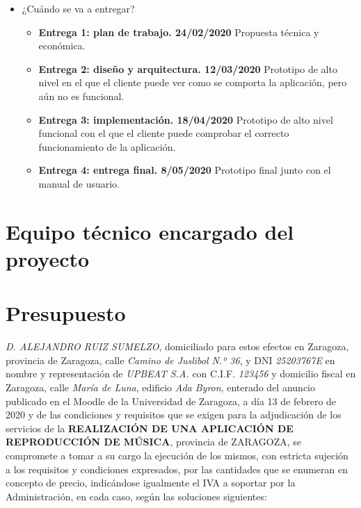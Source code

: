 \documentclass{article}
\begin{document}
\begin{itemize}
	\item ¿Cuándo se va a entregar?
	\begin{itemize}
		\item \textbf{Entrega 1: plan de trabajo. 24/02/2020}
		Propuesta técnica y económica.
		\item \textbf{Entrega 2: diseño y arquitectura. 12/03/2020}
		Prototipo de alto nivel en el que el cliente puede ver como se comporta la aplicación, pero aún no es funcional.
		\item \textbf{Entrega 3: implementación. 18/04/2020}
		Prototipo de alto nivel funcional con el que el cliente puede comprobar el correcto funcionamiento de la aplicación.
		\item \textbf{Entrega 4: entrega final. 8/05/2020}
		Prototipo final junto con el manual de usuario.
	\end{itemize}
\end{itemize}

\newpage

\section{Equipo técnico encargado del proyecto}

\newpage

\section{Presupuesto}
\textit{D. ALEJANDRO RUIZ SUMELZO}, domiciliado para estos efectos en Zaragoza, provincia de Zaragoza, calle \textit{Camino de Juslibol N.º 36}, y DNI \textit{25203767E} en nombre y representación de \textit{UPBEAT S.A.} con C.I.F. \textit{123456} y domicilio fiscal en Zaragoza, calle \textit{María de Luna}, edificio \textit{Ada Byron}, enterado del anuncio publicado en el Moodle de la Universidad de Zaragoza, a día 13 de febrero de 2020 y de las condiciones y requisitos que se exigen para la adjudicación de los servicios de la \textbf{REALIZACIÓN DE UNA APLICACIÓN DE REPRODUCCIÓN DE MÚSICA}, provincia de ZARAGOZA, se compromete a tomar a su cargo la ejecución de los mismos, con estricta sujeción a los requisitos y condiciones expresados, por las cantidades que se enumeran en concepto de precio, indicándose igualmente el IVA a soportar por la Administración, en cada caso, según las soluciones siguientes:

\begin{figure}[H]
\end{figure}
\end{document}
